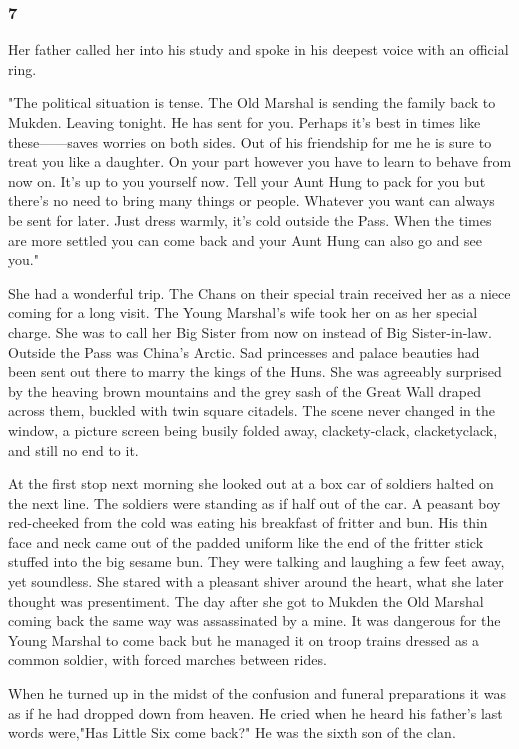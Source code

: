 \subsubsection*{7}



\par Her father called her into his study and spoke in his deepest voice with an official ring.
\par "The political situation is tense. The Old Marshal is sending the family back to Mukden. Leaving tonight. He has sent for you. Perhaps it's best in times like these——saves worries on both sides. Out of his friendship for me he is sure to treat you like a daughter. On your part however you have to learn to behave from now on. It's up to you yourself now. Tell your Aunt Hung to pack for you but there's no need to bring many things or people. Whatever you want can always be sent for later. Just dress warmly, it's cold outside the Pass. When the times are more settled you can come back and your Aunt Hung can also go and see you."
\par She had a wonderful trip. The Chans on their special train received her as a niece coming for a long visit. The Young Marshal's wife took her on as her special charge. She was to call her Big Sister from now on instead of Big Sister-in-law. Outside the Pass was China's Arctic. Sad princesses and palace beauties had been sent out there to marry the kings of the Huns. She was agreeably surprised by the heaving brown mountains and the grey sash of the Great Wall draped across them, buckled with twin square citadels. The scene never changed in the window, a picture screen being busily folded away, clackety-clack, clacketyclack, and still no end to it.
\par At the first stop next morning she looked out at a box car of soldiers halted on the next line. The soldiers were standing as if half out of the car. A peasant boy red-cheeked from the cold was eating his breakfast of fritter and bun. His thin face and neck came out of the padded uniform like the end of the fritter stick stuffed into the big sesame bun. They were talking and laughing a few feet away, yet soundless. She stared with a pleasant shiver around the heart, what she later thought was presentiment. The day after she got to Mukden the Old Marshal coming back the same way was assassinated by a mine. It was dangerous for the Young Marshal to come back but he managed it on troop trains dressed as a common soldier, with forced marches between rides.
\par When he turned up in the midst of the confusion and funeral preparations it was as if he had dropped down from heaven. He cried when he heard his father's last words were,"Has Little Six come back?" He was the sixth son of the clan.
